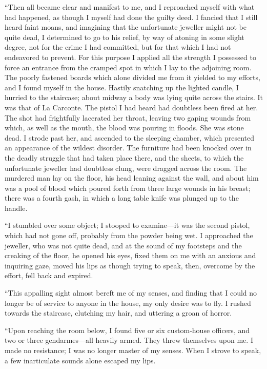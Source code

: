 “Then all became clear and manifest to me, and I reproached myself with
what had happened, as though I myself had done the guilty deed. I
fancied that I still heard faint moans, and imagining that the
unfortunate jeweller might not be quite dead, I determined to go to his
relief, by way of atoning in some slight degree, not for the crime I
had committed, but for that which I had not endeavored to prevent. For
this purpose I applied all the strength I possessed to force an
entrance from the cramped spot in which I lay to the adjoining room.
The poorly fastened boards which alone divided me from it yielded to my
efforts, and I found myself in the house. Hastily snatching up the
lighted candle, I hurried to the staircase; about midway a body was
lying quite across the stairs. It was that of La Carconte. The pistol I
had heard had doubtless been fired at her. The shot had frightfully
lacerated her throat, leaving two gaping wounds from which, as well as
the mouth, the blood was pouring in floods. She was stone dead. I
strode past her, and ascended to the sleeping chamber, which presented
an appearance of the wildest disorder. The furniture had been knocked
over in the deadly struggle that had taken place there, and the sheets,
to which the unfortunate jeweller had doubtless clung, were dragged
across the room. The murdered man lay on the floor, his head leaning
against the wall, and about him was a pool of blood which poured forth
from three large wounds in his breast; there was a fourth gash, in
which a long table knife was plunged up to the handle.

“I stumbled over some object; I stooped to examine—it was the second
pistol, which had not gone off, probably from the powder being wet. I
approached the jeweller, who was not quite dead, and at the sound of my
footsteps and the creaking of the floor, he opened his eyes, fixed them
on me with an anxious and inquiring gaze, moved his lips as though
trying to speak, then, overcome by the effort, fell back and expired.

“This appalling sight almost bereft me of my senses, and finding that I
could no longer be of service to anyone in the house, my only desire
was to fly. I rushed towards the staircase, clutching my hair, and
uttering a groan of horror.

“Upon reaching the room below, I found five or six custom-house
officers, and two or three gendarmes—all heavily armed. They threw
themselves upon me. I made no resistance; I was no longer master of my
senses. When I strove to speak, a few inarticulate sounds alone escaped
my lips.

